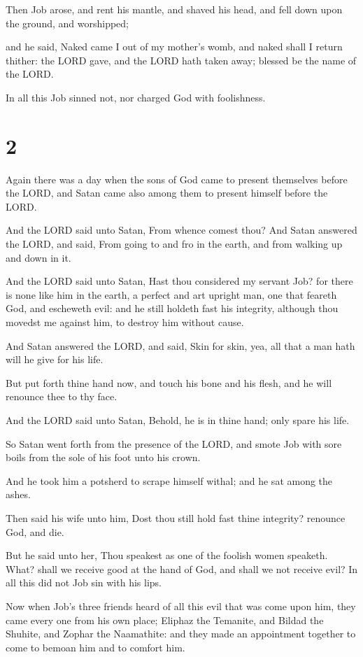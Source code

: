 \documentclass[12pt,oneside]{book}
\begin{document}
Then Job arose, and rent his mantle, and shaved his head, and fell down upon the ground, and worshipped;

and he said, Naked came I out of my mother's womb, and naked shall I return thither: the LORD gave, and the LORD hath taken away; blessed be the name of the LORD.

In all this Job sinned not, nor charged God with foolishness.

\chapter{2}
Again there was a day when the sons of God came to present themselves before the LORD, and Satan came also among them to present himself before the LORD.

And the LORD said unto Satan, From whence comest thou? And Satan answered the LORD, and said, From going to and fro in the earth, and from walking up and down in it.

And the LORD said unto Satan, Hast thou considered my servant Job? for there is none like him in the earth, a perfect and art upright man, one that feareth God, and escheweth evil: and he still holdeth fast his integrity, although thou movedst me against him, to destroy him without cause.

And Satan answered the LORD, and said, Skin for skin, yea, all that a man hath will he give for his life.

But put forth thine hand now, and touch his bone and his flesh, and he will renounce thee to thy face.

And the LORD said unto Satan, Behold, he is in thine hand; only spare his life.

So Satan went forth from the presence of the LORD, and smote Job with sore boils from the sole of his foot unto his crown.

And he took him a potsherd to scrape himself withal; and he sat among the ashes.

Then said his wife unto him, Dost thou still hold fast thine integrity? renounce God, and die.

But he said unto her, Thou speakest as one of the foolish women speaketh. What? shall we receive good at the hand of God, and shall we not receive evil? In all this did not Job sin with his lips.

Now when Job's three friends heard of all this evil that was come upon him, they came every one from his own place; Eliphaz the Temanite, and Bildad the Shuhite, and Zophar the Naamathite: and they made an appointment together to come to bemoan him and to comfort him.
\end{document}

